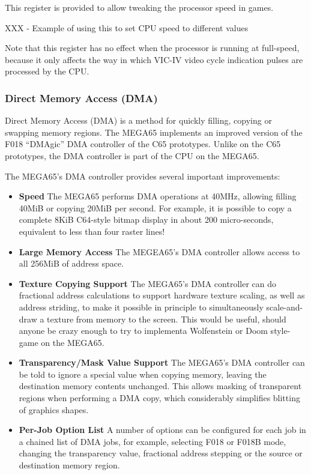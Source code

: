 This register is provided to allow tweaking the processor speed in games.

XXX - Example of using this to set CPU speed to different values

Note that this register has no effect when
the processor is running at full-speed, because it only affects the way in which VIC-IV
video cycle indication pulses are processed by the CPU.  

\subsubsection{Direct Memory Access (DMA)}
Direct Memory Access (DMA) is a method for quickly filling, copying or swapping memory regions.
The MEGA65 implements an improved version of the F018 ``DMAgic'' DMA controller of the C65 prototypes.
Unlike on the C65 prototypes, the DMA controller is part of the CPU on the MEGA65.

The MEGA65's DMA controller provides several important improvements:

\begin{itemize}
\item{\bf Speed} The MEGA65 performs DMA operations at 40MHz, allowing filling 40MiB or copying 20MiB
  per second.  For example, it is possible to copy a complete 8KiB C64-style bitmap display in
  about 200 micro-seconds, equivalent to less than four raster lines!
\item{\bf Large Memory Access} The MEGEA65's DMA controller allows access to all 256MiB of address space.
\item{\bf Texture Copying Support} The MEGA65's DMA controller can do fractional address calculations
  to support hardware texture scaling, as well as address striding, to make it possible in principle
  to simultaneously scale-and-draw a texture from memory to the screen. This would be useful, should
  anyone be crazy enough to try to implementa Wolfenstein or Doom style-game on the MEGA65.
\item{\bf Transparency/Mask Value Support} The MEGA65's DMA controller can be told to ignore a special value
  when copying memory, leaving the destination memory contents unchanged. This allows masking of transparent
  regions when performing a DMA copy, which considerably simplifies blitting of graphics shapes.
\item{\bf Per-Job Option List} A number of options can be configured for each job in a chained list of DMA
  jobs, for example, selecting F018 or F018B mode, changing the transparency value, fractional address stepping
  or the source or destination memory region.
\end{itemize}

